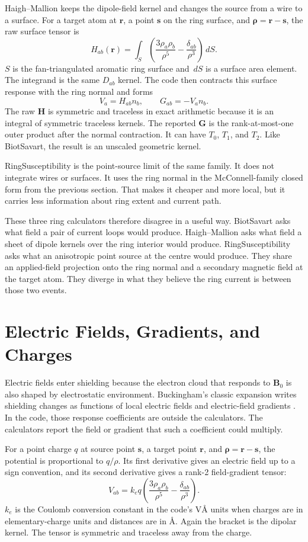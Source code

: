 \documentclass[11pt]{article}
\newcommand{\dd}{\,d}
\begin{document}
Haigh--Mallion keeps the dipole-field kernel and changes the source from a wire
to a surface. For a target atom at \(\bm r\), a point \(\bm s\) on the ring
surface, and \(\bm\rho=\bm r-\bm s\), the raw surface tensor is
\[
  H_{ab}(\bm r)
  =
  \int_S
  \left(
    \frac{3\rho_a\rho_b}{\rho^5}
    -\frac{\delta_{ab}}{\rho^3}
  \right)
  \dd S .
\]
\(S\) is the fan-triangulated aromatic ring surface and \(\dd S\) is a surface
area element. The integrand is the same \(D_{ab}\) kernel. The code then
contracts this surface response with the ring normal and forms
\[
  V_a=H_{ab}n_b,
  \qquad
  G_{ab}=-V_a n_b .
\]
The raw \(\bm H\) is symmetric and traceless in exact arithmetic because it is
an integral of symmetric traceless kernels. The reported \(\bm G\) is the
rank-at-most-one outer product after the normal contraction. It can have
\(T_0\), \(T_1\), and \(T_2\). Like BiotSavart, the result is an unscaled
geometric kernel.

RingSusceptibility is the point-source limit of the same family. It does not
integrate wires or surfaces. It uses the ring normal in the McConnell-family
closed form from the previous section. That makes it cheaper and more local,
but it carries less information about ring extent and current path.

These three ring calculators therefore disagree in a useful way. BiotSavart
asks what field a pair of current loops would produce. Haigh--Mallion asks what
field a sheet of dipole kernels over the ring interior would produce.
RingSusceptibility asks what an anisotropic point source at the centre would
produce. They share an applied-field projection onto the ring normal and a
secondary magnetic field at the target atom. They diverge in what they believe
the ring current is between those two events.

\section{Electric Fields, Gradients, and Charges}

Electric fields enter shielding because the electron cloud that responds to
\(\bm B_0\) is also shaped by electrostatic environment. Buckingham's classic
expansion writes shielding changes as functions of local electric fields and
electric-field gradients \cite{buckingham1960}. In the code, those response
coefficients are outside the calculators. The calculators report the field or
gradient that such a coefficient could multiply.

For a point charge \(q\) at source point \(\bm s\), a target point \(\bm r\),
and \(\bm\rho=\bm r-\bm s\), the potential is proportional to \(q/\rho\). Its
first derivative gives an electric field up to a sign convention, and its
second derivative gives a rank-2 field-gradient tensor:
\[
  V_{ab}
  =
  k_e q
  \left(
    \frac{3\rho_a\rho_b}{\rho^5}
    -\frac{\delta_{ab}}{\rho^3}
  \right).
\]
\(k_e\) is the Coulomb conversion constant in the code's
\(\si{\volt\angstrom}\) units when charges are in elementary-charge units and
distances are in \(\si{\angstrom}\). Again the bracket is the dipolar kernel.
The tensor is symmetric and traceless away from the charge.
\end{document}
